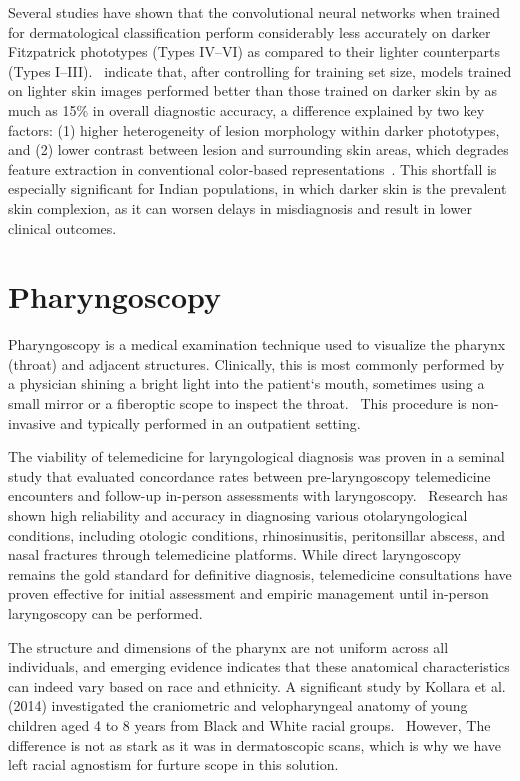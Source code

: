 Several studies have shown that the convolutional neural networks when trained for dermatological classification perform considerably less accurately on darker Fitzpatrick phototypes (Types IV–VI) as compared to their lighter counterparts (Types I–III).~\cite{abhi} indicate that, after controlling for training set size, models trained on lighter skin images performed better than those trained on darker skin by as much as 15\% in overall diagnostic accuracy, a difference explained by two key factors: (1) higher heterogeneity of lesion morphology within darker phototypes, and (2) lower contrast between lesion and surrounding skin areas, which degrades feature extraction in conventional color‐based representations~\cite{abhi}. This shortfall is especially significant for Indian populations, in which darker skin is the prevalent skin complexion, as it can worsen delays in misdiagnosis and result in lower clinical outcomes.

\section{Pharyngoscopy}

Pharyngoscopy is a medical examination technique used to visualize the pharynx (throat) and adjacent structures. Clinically, this is most commonly performed by a physician shining a bright light into the patient`s mouth, sometimes using a small mirror or a fiberoptic scope to inspect the throat.~\cite{onto} This procedure is non-invasive and typically performed in an outpatient setting. \par

The viability of telemedicine for laryngological diagnosis was proven in a seminal study that evaluated concordance rates between pre-laryngoscopy telemedicine encounters and follow-up in-person assessments with laryngoscopy.~\cite{choi} Research has shown high reliability and accuracy in diagnosing various otolaryngological conditions, including otologic conditions, rhinosinusitis, peritonsillar abscess, and nasal fractures through telemedicine platforms. While direct laryngoscopy remains the gold standard for definitive diagnosis, telemedicine consultations have proven effective for initial assessment and empiric management until in-person laryngoscopy can be performed. \par

The structure and dimensions of the pharynx are not uniform across all individuals, and emerging evidence indicates that these anatomical characteristics can indeed vary based on race and ethnicity. A significant study by Kollara et al. (2014) investigated the craniometric and velopharyngeal anatomy of young children aged 4 to 8 years from Black and White racial groups.~\cite{kollara} However, The difference is not as stark as it was in dermatoscopic scans, which is why we have left racial agnostism for furture scope in this solution.

